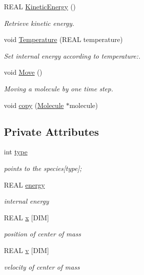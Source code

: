 \begin{CompactItemize}
\item 
REAL \hyperlink{classMolecule_2b5eba8c03b1496587754b9b5b407064}{KineticEnergy} ()
\begin{CompactList}\small\item\em Retrieve kinetic energy. \item\end{CompactList}\item 
void \hyperlink{classMolecule_3e60d33531b5e720051f41155d194e93}{Temperature} (REAL temperature)
\begin{CompactList}\small\item\em Set internal energy according to temperature:. \item\end{CompactList}\item 
void \hyperlink{classMolecule_328a0ac9cc33a1a6e2c1e17087eb4762}{Move} ()
\begin{CompactList}\small\item\em Moving a molecule by one time step. \item\end{CompactList}\item 
void \hyperlink{classMolecule_ed5cd1c9eb118054e0ed2f058a672676}{copy} (\hyperlink{classMolecule}{Molecule} $\ast$molecule)
\end{CompactItemize}
\subsection*{Private Attributes}
\begin{CompactItemize}
\item 
int \hyperlink{classMolecule_3e459e9ae52f281073d4821b9af72b60}{type}
\begin{CompactList}\small\item\em points to the species\mbox{[}type\mbox{]}; \item\end{CompactList}\item 
REAL \hyperlink{classMolecule_2057df9ea61493ef02a722f06e6fe607}{energy}
\begin{CompactList}\small\item\em internal energy \item\end{CompactList}\item 
REAL \hyperlink{classMolecule_21a3fe802207db2ce796f30864c4d131}{x} \mbox{[}DIM\mbox{]}
\begin{CompactList}\small\item\em position of center of mass \item\end{CompactList}\item 
REAL \hyperlink{classMolecule_91748f8e6a013950f86e50861eb7fc2f}{v} \mbox{[}DIM\mbox{]}
\begin{CompactList}\small\item\em velocity of center of mass \item\end{CompactList}\end{CompactItemize}



